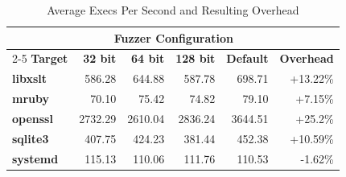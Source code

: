 \begin{table}[htbp]
\centering
\begin{tabular}{lrrrrr}
\toprule
& \multicolumn{4}{c}{\textbf{Fuzzer Configuration}} \\
\cmidrule(l){2-5}
\textbf{Target} & \textbf{32 bit} & \textbf{64 bit} & \textbf{128 bit} & \textbf{Default} & \textbf{Overhead} \\
\midrule
\textbf{libxslt} & 586.28 & 644.88 & 587.78 & 698.71 & +13.22\% \\ 
\textbf{mruby} & 70.10 & 75.42 & 74.82 & 79.10 & +7.15\% \\ 
\textbf{openssl} & 2732.29 & 2610.04 & 2836.24 & 3644.51 & +25.2\% \\ 
\textbf{sqlite3} & 407.75 & 424.23 & 381.44 & 452.38 & +10.59\% \\ 
\textbf{systemd} & 115.13 & 110.06 & 111.76 & 110.53 & -1.62\% \\ 
\bottomrule
\end{tabular}
\caption{Average Execs Per Second and Resulting Overhead}
\label{tab:exec_overhead}
\end{table}